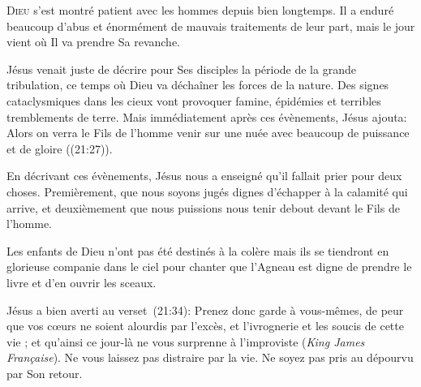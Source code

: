 



\lettrine{D}{ieu} s'est montré patient avec les hommes
 depuis bien longtemps.
 Il a enduré beaucoup d'abus et énormément
 de mauvais traitements de leur part,
 mais le jour vient où Il va prendre Sa revanche.

Jésus venait juste de décrire pour Ses disciples la période
 de la grande tribulation, ce temps où Dieu va déchaîner les forces
 de la nature. Des signes cataclysmiques dans les cieux vont provoquer famine,
 épidémies et terribles tremblements de terre.
 Mais immédiatement après ces évènements, Jésus ajouta: 
 \Og Alors on verra le Fils de l'homme venir sur une nuée avec beaucoup
 de puissance et de gloire \Fg{} ((21:27)).


En décrivant ces évènements, Jésus nous a enseigné qu'il fallait prier pour deux choses.
 Premièrement, que nous soyons jugés dignes d'échapper à la calamité
 qui arrive, et deuxièmement que nous puissions nous tenir debout
 devant le Fils de l'homme.

Les enfants de Dieu n'ont pas été destinés à la colère mais ils se tiendront
 en glorieuse companie dans le ciel pour chanter que l'Agneau
 est digne de prendre le livre et d'en ouvrir les sceaux.

Jésus a bien averti au verset~(21:34): 
 \Og Prenez donc garde à vous-mêmes, de peur que vos c\oe{}urs ne soient
 alourdis par l’excès, et l’ivrognerie et les soucis de cette vie ;
 et qu'ainsi ce jour-là ne vous surprenne à l’improviste \Fg{}
 (\textit{King James Fran\c{c}aise}).
 Ne vous laissez pas distraire par la vie.
 Ne soyez pas pris au dépourvu par Son retour.

